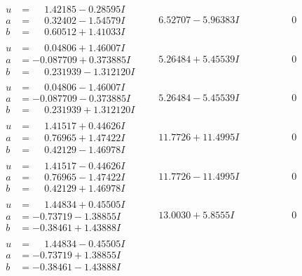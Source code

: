 \documentclass[1p]{elsarticle_modified}
\theoremstyle{definition}
\begin{document}
$$\begin{array}{c|c|c}
\begin{aligned}
u &= \phantom{-}1.42185 - 0.28595 I \\
a &= \phantom{-}0.32402 - 1.54579 I \\
b &= \phantom{-}0.60512 + 1.41033 I\end{aligned}
 & \phantom{-}6.52707 - 5.96383 I & \phantom{-0.000000 } 0 \\ \hline\begin{aligned}
u &= \phantom{-}0.04806 + 1.46007 I \\
a &= -0.087709 + 0.373885 I \\
b &= \phantom{-}0.231939 - 1.312120 I\end{aligned}
 & \phantom{-}5.26484 + 5.45539 I & \phantom{-0.000000 } 0 \\ \hline\begin{aligned}
u &= \phantom{-}0.04806 - 1.46007 I \\
a &= -0.087709 - 0.373885 I \\
b &= \phantom{-}0.231939 + 1.312120 I\end{aligned}
 & \phantom{-}5.26484 - 5.45539 I & \phantom{-0.000000 } 0 \\ \hline\begin{aligned}
u &= \phantom{-}1.41517 + 0.44626 I \\
a &= \phantom{-}0.76965 + 1.47422 I \\
b &= \phantom{-}0.42129 - 1.46978 I\end{aligned}
 & \phantom{-}11.7726 + 11.4995 I & \phantom{-0.000000 } 0 \\ \hline\begin{aligned}
u &= \phantom{-}1.41517 - 0.44626 I \\
a &= \phantom{-}0.76965 - 1.47422 I \\
b &= \phantom{-}0.42129 + 1.46978 I\end{aligned}
 & \phantom{-}11.7726 - 11.4995 I & \phantom{-0.000000 } 0 \\ \hline\begin{aligned}
u &= \phantom{-}1.44834 + 0.45505 I \\
a &= -0.73719 - 1.38855 I \\
b &= -0.38461 + 1.43888 I\end{aligned}
 & \phantom{-}13.0030 + 5.8555 I & \phantom{-0.000000 } 0 \\ \hline\begin{aligned}
u &= \phantom{-}1.44834 - 0.45505 I \\
a &= -0.73719 + 1.38855 I \\
b &= -0.38461 - 1.43888 I\end{aligned}

\end{array}$$
\end{document}
